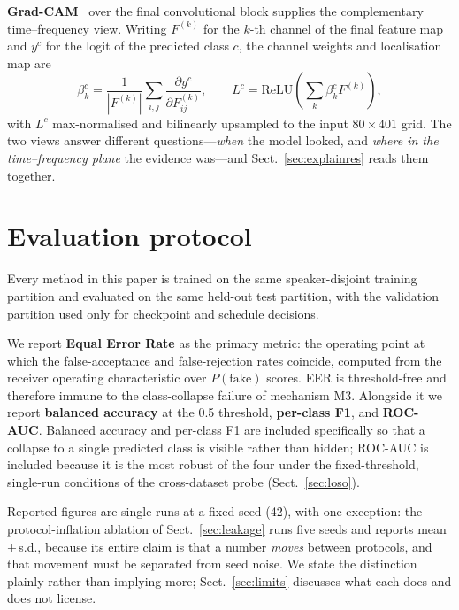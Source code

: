 \documentclass[sn-mathphys-num,pdflatex]{sn-jnl}
\begin{document}
\textbf{Grad-CAM}~\cite{gradcam} over the final convolutional block supplies the
complementary time--frequency view. Writing $F^{(k)}$ for the $k$-th channel of
the final feature map and $y^{c}$ for the logit of the predicted class $c$, the
channel weights and localisation map are
\begin{equation}
\beta^c_k = \frac{1}{|F^{(k)}|}\sum_{i,j} \frac{\partial y^c}{\partial F^{(k)}_{ij}},
\qquad
L^c = \mathrm{ReLU}\!\left(\sum_k \beta^c_k F^{(k)}\right),
\end{equation}
with $L^c$ max-normalised and bilinearly upsampled to the input
$80 \times 401$ grid. The two views answer different questions---\emph{when} the
model looked, and \emph{where in the time--frequency plane} the evidence
was---and Sect.~\ref{sec:explainres} reads them together.

\section{Evaluation protocol}\label{sec:protocol}

Every method in this paper is trained on the same speaker-disjoint training
partition and evaluated on the same held-out test partition, with the
validation partition used only for checkpoint and schedule decisions.

We report \textbf{Equal Error Rate} as the primary metric: the operating point
at which the false-acceptance and false-rejection rates coincide, computed from
the receiver operating characteristic over $P(\text{fake})$ scores. EER is
threshold-free and therefore immune to the class-collapse failure of
mechanism M3. Alongside it we report \textbf{balanced accuracy} at the 0.5
threshold, \textbf{per-class F1}, and \textbf{ROC-AUC}. Balanced accuracy and
per-class F1 are included specifically so that a collapse to a single predicted
class is visible rather than hidden; ROC-AUC is included because it is the most
robust of the four under the fixed-threshold, single-run conditions of the
cross-dataset probe (Sect.~\ref{sec:loso}).

Reported figures are single runs at a fixed seed (42), with one exception: the
protocol-inflation ablation of Sect.~\ref{sec:leakage} runs five seeds and
reports mean\,$\pm$\,s.d., because its entire claim is that a number
\emph{moves} between protocols, and that movement must be separated from seed
noise. We state the distinction plainly rather than implying more;
Sect.~\ref{sec:limits} discusses what each does and does not license.
\end{document}
